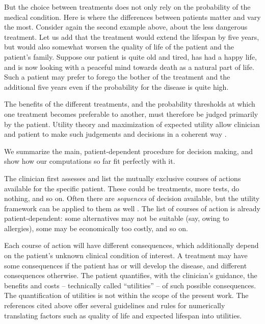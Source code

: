 \documentclass[utf8]{FrontiersinHarvard} %
\renewcommand*{\|}[1][]{\nonscript\:#1\vert\nonscript\:\mathopen{}}
\begin{document}
But the choice between treatments does not only rely on the probability of the medical condition. Here is where the differences between patients matter and vary the most. Consider again the second example above, about the less dangerous treatment. Let us add that the treatment would extend the lifespan by five years, but would also somewhat worsen the quality of life of the patient and the patient's family. Suppose our patient is quite old and tired, has had a happy life, and is now looking with a peaceful mind towards death as a natural part of life. Such a patient may prefer to forego the bother of the treatment and the additional five years even if the probability for the disease is quite high.

The benefits of the different treatments, and the probability thresholds at which one treatment becomes preferable to another, must therefore be judged primarily by the patient. Utility theory and maximization of expected utility allow clinician and patient to make such judgements and decisions in a coherent way \citetext{\citealp{soxetal1988_r2013,huninketal2001_r2014}; see also the clear and charming exposition by \citealp{lindley1971_r1988}}.

We summarize the main, patient-dependent procedure for decision making, and show how our computations so far fit perfectly with it.

The clinician first assesses and list the mutually exclusive courses of actions available for the specific patient. These could be treatments, more tests, do nothing, and so on. Often there are \emph{sequences} of decision available, but the utility framework can be applied to them as well \citetext{see references above and \citealp{raiffa1968_r1970}}. The list of courses of action is already patient-dependent: some alternatives may not be suitable (say, owing to allergies), some may be economically too costly, and so on.

Each course of action will have different consequences, which additionally depend on the patient's unknown clinical condition of interest. A treatment may have some consequences if the patient has or will develop the disease, and different consequences otherwise. The patient quantifies, with the clinician's guidance, the benefits and costs -- technically called \enquote{utilities} -- of such possible consequences. The quantification of utilities is not within the scope of the present work. The references cited above offer several guidelines and rules for numerically translating factors such as quality of life and expected lifespan into utilities.
\end{document}
